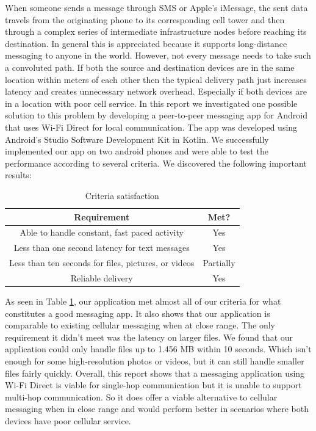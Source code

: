 \documentclass[10pt]{article}
\begin{document}
When someone sends a message through SMS or Apple's iMessage, the sent data travels from the originating phone to its corresponding cell tower and then through a complex series of intermediate infrastructure nodes before reaching its destination. In general this is appreciated because it supports long-distance messaging to anyone in the world. However, not every message needs to take such a convoluted path. If both the source and destination devices are in the same location within meters of each other then the typical delivery path just increases latency and creates unnecessary network overhead. Especially if both devices are in a location with poor cell service. In this report we investigated one possible solution to this problem by developing a peer-to-peer messaging app for Android that uses Wi-Fi Direct for local communication. The app was developed using Android’s Studio Software Development Kit in Kotlin. We successfully implemented our app on two android phones and were able to test the performance according to several criteria. We discovered the following important results:

\begin{table}[h!]
    \centering
    \begin{tabular}{|c|c|}
        \hline
        Requirement & Met?\\
        \hline \hline
        Able to handle constant, fast paced activity & Yes\\
        \hline
        Less than one second latency for text messages & Yes\\
        \hline
        Less than ten seconds for files, pictures, or videos & Partially\\
        \hline
        Reliable delivery & Yes\\
        \hline
    \end{tabular}
    \caption{Criteria satisfaction}
    \label{tab:conclusions}
\end{table}

As seen in Table \ref{tab:conclusions}, our application met almost all of our criteria for what constitutes a good messaging app. It also shows that our application is comparable to existing cellular messaging when at close range. The only requirement it didn't meet was the latency on larger files. We found that our application could only handle files up to 1.456 MB within 10 seconds. Which isn't enough for some high-resolution photos or videos, but it can still handle smaller files fairly quickly. Overall, this report shows that a messaging application using Wi-Fi Direct is viable for single-hop communication but it is unable to support multi-hop communication. So it does offer a viable alternative to cellular messaging when in close range and would perform better in scenarios where both devices have poor cellular service.

\renewcommand{\refname} {\section{References}}

{}
\end{document}
